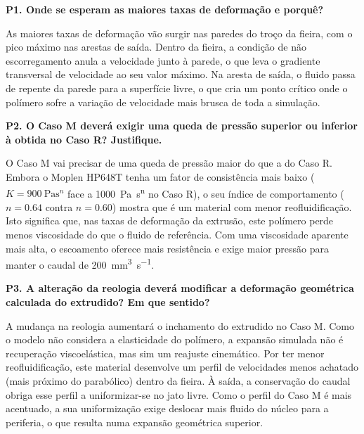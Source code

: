 \textbf{P1. Onde se esperam as maiores taxas de deformação e porquê?}

As maiores taxas de deformação vão surgir nas paredes do troço da fieira, com o pico máximo nas arestas de saída. Dentro da fieira, a condição de não escorregamento anula a velocidade junto à parede, o que leva o gradiente transversal de velocidade ao seu valor máximo. Na aresta de saída, o fluido passa de repente da parede para a superfície livre, o que cria um ponto crítico onde o polímero sofre a variação de velocidade mais brusca de toda a simulação.

\textbf{P2. O Caso M deverá exigir uma queda de pressão superior ou inferior à obtida no Caso R? Justifique.}

O Caso M vai precisar de uma queda de pressão maior do que a do Caso R. Embora o Moplen HP648T tenha um fator de consistência mais baixo ($K = \qty{900}{\pascal\second\tothe{n}}$ face a \qty{1000}{\pascal\second\tothe{n}} no Caso R), o seu índice de comportamento ($n = \num{0,64}$ contra $n = \num{0,60}$) mostra que é um material com menor reofluidificação. Isto significa que, nas taxas de deformação da extrusão, este polímero perde menos viscosidade do que o fluido de referência. Com uma viscosidade aparente mais alta, o escoamento oferece mais resistência e exige maior pressão para manter o caudal de \qty{200}{\milli\metre\cubed\per\second}.

\textbf{P3. A alteração da reologia deverá modificar a deformação geométrica calculada do extrudido? Em que sentido?}

A mudança na reologia aumentará o inchamento do extrudido no Caso M. Como o modelo não considera a elasticidade do polímero, a expansão simulada não é recuperação viscoelástica, mas sim um reajuste cinemático. Por ter menor reofluidificação, este material desenvolve um perfil de velocidades menos achatado (mais próximo do parabólico) dentro da fieira. À saída, a conservação do caudal obriga esse perfil a uniformizar-se no jato livre. Como o perfil do Caso M é mais acentuado, a sua uniformização exige deslocar mais fluido do núcleo para a periferia, o que resulta numa expansão geométrica superior.
